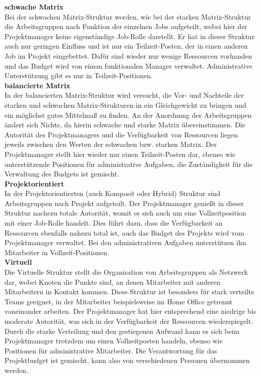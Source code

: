 \documentclass[ThesisDJ.tex]{subfiles}
\begin{document}
\textbf{schwache Matrix}\\
Bei der schwachen Matrix-Struktur werden, wie bei der starken Matrix-Struktur die Arbeitsgruppen nach Funktion der einzelnen Jobs aufgeteilt, wobei hier der Projektmanager keine eigenständige Job-Rolle darstellt. Er hat in dieser Struktur auch nur geringen Einfluss und ist nur ein Teilzeit-Posten, der in einen anderen Job im Projekt eingebettet. Dafür sind wieder nur wenige Ressourcen vorhanden und das Budget wird von einem funktionalen Manager verwaltet. Administrative Unterstützung gibt es nur in Teilzeit-Positionen.\medskip\\

\textbf{balancierte Matrix}\\
In der balancierten Matrix-Struktur wird versucht, die Vor- und Nachteile der starken und schwachen Matrix-Strukturen in ein Gleichgewicht zu bringen und ein möglichst gutes Mittelmaß zu finden. An der Anordnung der Arbeitsgruppen ändert sich Nichts, da hierin schwache und starke Matrix übereinstimmen. Die Autorität des Projektmanagers und die Verfügbarkeit von Ressourcen liegen jeweils zwischen den Werten der schwachen bzw. starken Matrix. Der Projektmanager stellt hier wieder nur einen Teilzeit-Posten dar, ebenso wie unterstützende Positionen für administrative Aufgaben, die Zuständigkeit für die Verwaltung des Budgets ist gemischt.\medskip\\

\textbf{Projektorientiert}\\
In der Projektorientierten (auch Komposit oder Hybrid) Struktur sind Arbeitsgruppen nach Projekt aufgeteilt. Der Projektmanager genießt in dieser Struktur nachezu totale Autorität, womit es sich auch um eine Vollzeitposition mit einer Job-Rolle handelt. Dies führt dazu, dass die Verfügbarkeit an Ressourcen ebenfalls nahezu total ist, auch das Budget des Projekts wird vom Projektmanager verwaltet. Bei den administrativen Aufgaben unterstützen ihn Mitarbeiter in Vollzeit-Positionen.\medskip\\

\textbf{Virtuell}\\
Die Virtuelle Struktur stellt die Organisation von Arbeitsgruppen als Netzwerk dar, wobei Knoten die Punkte sind, an denen Mitarbeiter mit anderen Mitarbeitern in Kontakt kommen. Diese Struktur ist besonders für stark verteilte Teams geeignet, in der Mitarbeiter beispielsweise im Home Office getrennt voneinander arbeiten. Der Projektmanager hat hier entsprechend eine niedrige bis moderate Autorität, was sich in der Verfügbarkeit der Ressourcen wiederspiegelt. Durch die starke Verteilung und den gestiegenen Aufwand kann es sich beim Projektmanager trotzdem um einen Vollzeitposten handeln, ebenso wie Positionen für administrative Mitarbeiter. Die Verantwortung für das Projektbudget ist gemischt, kann also von verschiedenen Personen übernommen werden.\medskip\\
\end{document}
